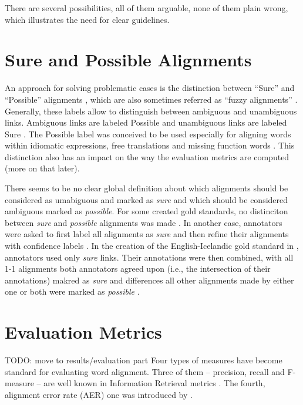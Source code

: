 There are several possibilities, all of them arguable, none of them plain wrong, which illustrates the need for clear guidelines.

\section{Sure and Possible Alignments}
\label{sec:sure_possible}
An approach for solving problematic cases is the distinction between \enquote{Sure} and \enquote{Possible} alignments \autocite{och-ney-2000-improved}, which are also sometimes referred as \enquote{fuzzy alignments} \autocite{clematide2018}. 
Generally, these labels allow to distinguish between ambiguous and unambiguous links. 
Ambiguous links are labeled Possible and unambiguous links are labeled Sure \autocite{lambert2005}. 
The Possible label was conceived to be used especially for aligning words within idiomatic expressions, free translations and missing function words \autocite{och-ney-2000-improved}.
This distinction also has an impact on the way the evaluation metrics are computed (more on that later).

There seems to be no clear global definition about which alignments should be considered as umabiguous and marked as \emph{sure} and which should be considered ambiguous marked as \emph{possible}. 
For some created gold standards, no distinciton between \emph{sure} and \emph{possible} alignments was made \autocite{clematide2018}. 
In another case, annotators were asked to first label all alignments as \emph{sure} and then refine their alignments with confidence labels \autocite{holmqvist-ahrenberg-2011-gold}. 
In the creation of the English-Icelandic gold standard in \cite{steingrimsson-etal-2021-combalign},  annotators used only \emph{sure} links. 
Their annotations were then combined, with all 1-1 alignments both annotators agreed upon (i.e., the intersection of their annotations) makred as \emph{sure} and differences all other alignments made by either one or both were marked as \emph{possible} \autocite{steingrimsson-etal-2021-combalign}. 

\section{Evaluation Metrics}
TODO: move to results/evaluation part
Four types of measures have become standard for evaluating word alignment. Three of them -- precision, recall and F-measure -- are well known in Information Retrieval metrics \cite{mihalcea-pedersen-2003-evaluation}. 
The fourth, alignment error rate (AER) one was introduced by \cite{och-ney-2000-improved}.

